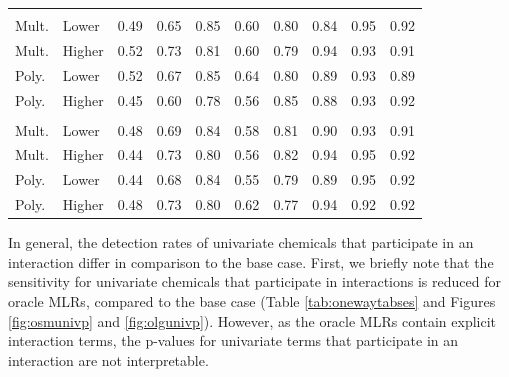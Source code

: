 \documentclass[12pt, twoside]{amherstthesis}
\begin{document}
\begin{table}
\begin{tabular}[t]{llrrrrrrrr}
\addlinespace[0.3em]
\multicolumn{10}{l}{\textbf{Ni-Co}}\\
\hspace{1em}Mult. & Lower & 0.49 & 0.65 & 0.85 & 0.60 & 0.80 & 0.84 & 0.95 & 0.92\\
\hspace{1em}Mult. & Higher & 0.52 & 0.73 & 0.81 & 0.60 & 0.79 & 0.94 & 0.93 & 0.91\\
\hspace{1em}Poly. & Lower & 0.52 & 0.67 & 0.85 & 0.64 & 0.80 & 0.89 & 0.93 & 0.89\\
\hspace{1em}Poly. & Higher & 0.45 & 0.60 & 0.78 & 0.56 & 0.85 & 0.88 & 0.93 & 0.92\\
\addlinespace[0.3em]
\multicolumn{10}{l}{\textbf{Hg-Ni-Tl}}\\
\hspace{1em}Mult. & Lower & 0.48 & 0.69 & 0.84 & 0.58 & 0.81 & 0.90 & 0.93 & 0.91\\
\hspace{1em}Mult. & Higher & 0.44 & 0.73 & 0.80 & 0.56 & 0.82 & 0.94 & 0.95 & 0.92\\
\hspace{1em}Poly. & Lower & 0.44 & 0.68 & 0.84 & 0.55 & 0.79 & 0.89 & 0.95 & 0.92\\
\hspace{1em}Poly. & Higher & 0.48 & 0.73 & 0.80 & 0.62 & 0.77 & 0.94 & 0.92 & 0.92\\
\bottomrule
\end{tabular}
\end{table}
In general, the detection rates of univariate chemicals that participate in an interaction differ in comparison to the base case. First, we briefly note that the sensitivity for univariate chemicals that participate in interactions is reduced for oracle MLRs, compared to the base case (Table \ref{tab:onewaytabses} and Figures \ref{fig:osmunivp} and \ref{fig:olgunivp}). However, as the oracle MLRs contain explicit interaction terms, the p-values for univariate terms that participate in an interaction are not interpretable.
\end{document}
